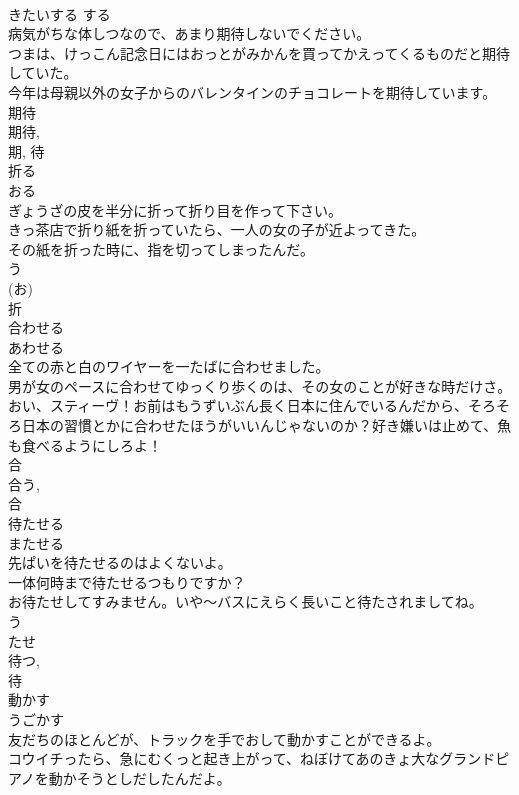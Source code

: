 \documentclass[8pt]{extreport}
\begin{document}
\begin{CJK}{UTF8}{min}
\\	きたいする	する 
\\	病気がちな体しつなので、あまり期待しないでください。	
\\	つまは、けっこん記念日にはおっとがみかんを買ってかえってくるものだと期待していた。	
\\	今年は母親以外の女子からのバレンタインのチョコレートを期待しています。	
\\	期待 
\\	期待, 
\\	期, 待	
\\	折る	
\\	おる	
\\	ぎょうざの皮を半分に折って折り目を作って下さい。	
\\	きっ茶店で折り紙を折っていたら、一人の女の子が近よってきた。	
\\	その紙を折った時に、指を切ってしまったんだ。	
\\	う 
\\	(お) 
\\	折	
\\	合わせる	
\\	あわせる	
\\	全ての赤と白のワイヤーを一たばに合わせました。	
\\	男が女のペースに合わせてゆっくり歩くのは、その女のことが好きな時だけさ。	
\\	おい、スティーヴ！お前はもうずいぶん長く日本に住んでいるんだから、そろそろ日本の習慣とかに合わせたほうがいいんじゃないのか？好き嫌いは止めて、魚も食べるようにしろよ！	
\\	合 
\\	合う, 
\\	合	
\\	待たせる	
\\	またせる	
\\	先ぱいを待たせるのはよくないよ。	
\\	一体何時まで待たせるつもりですか？	
\\	お待たせしてすみません。いや〜バスにえらく長いこと待たされましてね。	
\\	う 
\\	たせ 
\\	待つ, 
\\	待	
\\	動かす	
\\	うごかす	
\\	友だちのほとんどが、トラックを手でおして動かすことができるよ。	
\\	コウイチったら、急にむくっと起き上がって、ねぼけてあのきょ大なグランドピアノを動かそうとしだしたんだよ。	

\end{CJK}
\end{document}
